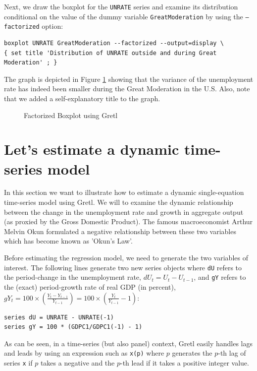 \documentclass[11pt]{article}
\begin{document}
Next, we draw the boxplot for the \texttt{UNRATE} series and examine its distribution conditional on the value of the dummy variable \texttt{GreatModeration} by using the \texttt{---factorized} option: 
\begin{Verbatim}[baselinestretch=0.75, fontsize=\small]
boxplot UNRATE GreatModeration --factorized --output=display \
{ set title 'Distribution of UNRATE outside and during Great Moderation' ; }
\end{Verbatim}
The graph is depicted in Figure \ref{fig:Plot2} showing that the variance of the unemployment rate has indeed been smaller during the Great Moderation in the U.S. Also, note that we added a self-explanatory title to the graph.

\begin{figure}[h!]
	\centering
	\caption{Factorized Boxplot using Gretl}
	\label{fig:Plot2}
\end{figure}



\section{Let's estimate a dynamic time-series model}
In this section we want to illustrate how to estimate a dynamic single-equation time-series model using Gretl. We will to examine the dynamic relationship between the change in the unemployment rate and growth in aggregate output (as proxied by the Gross Domestic Product). The famous macroeconomist Arthur Melvin Okun formulated a negative relationship between these two variables which has become known as 'Okun's Law'.

Before estimating the regression model, we need to generate the two variables of interest. The following lines generate two new series objects where \texttt{dU} refers to the period-change in the unemployment rate, $ dU_t = U_t - U_{t-1} $, and \texttt{gY} refers to the (exact) period-growth rate of real GDP (in percent), $ gY_t =  100 \times \left( \frac{Y_t-Y_{t-1}}{Y_{t-1}}\right) = 100 \times \left( \frac{Y_t}{Y_{t-1}}-1 \right)$:
\begin{Verbatim}[baselinestretch=0.75, fontsize=\small]
series dU = UNRATE - UNRATE(-1)
series gY = 100 * (GDPC1/GDPC1(-1) - 1)
\end{Verbatim}
As can be seen, in a time-series (but also panel) context, Gretl easily handles lags and leads by using an expression such as \texttt{x(p)} where $ p $ generates the $ p $-th lag of series \texttt{x} if $p$  takes a negative and the $ p $-th lead if it takes a positive integer value.
\end{document}
